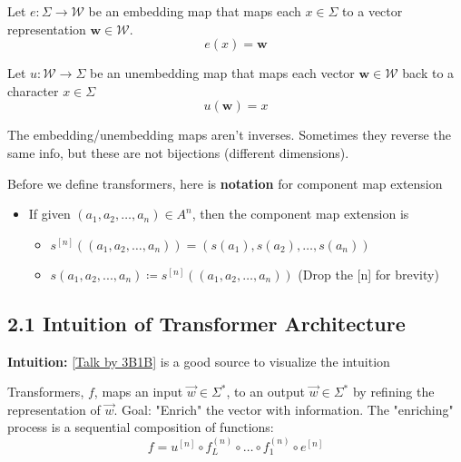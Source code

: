 \documentclass[12pt, twoside]{article}
\begin{document}
\begin{definition}
Let $e: \Sigma \to \mathcal{W}$ be an embedding map that maps each $x \in \Sigma$ to a vector representation $\mathbf{w} \in \mathcal{W}$.
$$ e(x) = \mathbf{w} $$
\end{definition}

\begin{definition}
Let $u: \mathcal{W} \to \Sigma$ be an unembedding map that maps each vector $\mathbf{w} \in \mathcal{W}$ back to a character $x \in \Sigma$
$$ u(\mathbf{w}) = x $$
\end{definition}

\begin{remark}
    The embedding/unembedding maps aren't inverses. Sometimes they reverse the same info, but these are not bijections (different dimensions).
\end{remark}

\newpage

Before we define transformers, here is \textbf{notation} for component map extension
\begin{itemize}
    \item If given $(a_1,a_2,\dots,a_n)\in A^n$, then the component map extension is
        \begin{itemize}
        \item $s^{[n]}((a_1,a_2,\dots,a_n))=(s(a_1),s(a_2),\dots,s(a_n))$
        \item $s(a_1,a_2,...,a_n)\coloneqq s^{[n]}((a_1,a_2,\dots,a_n))$ (Drop the [n] for brevity)
    \end{itemize}
\end{itemize}

\subsection*{2.1 Intuition of Transformer Architecture }

\textbf{Intuition:} \href{https://www.youtube.com/watch?v=KJtZARuO3JY}{[Talk by 3B1B]} is a good source to visualize the intuition

Transformers, $f$, maps an input $\Vec{w}\in \Sigma^*$,  to an output $\Vec{w}\in \Sigma^*$ by refining the representation of $\Vec{w}$. Goal: "Enrich" the vector with information. The "enriching" process is a sequential composition of functions:
\[ f = u^{[n]} \circ f_L^{(n)} \circ \dots \circ f_1^{(n)} \circ e^{[n]} \]
\end{document}
